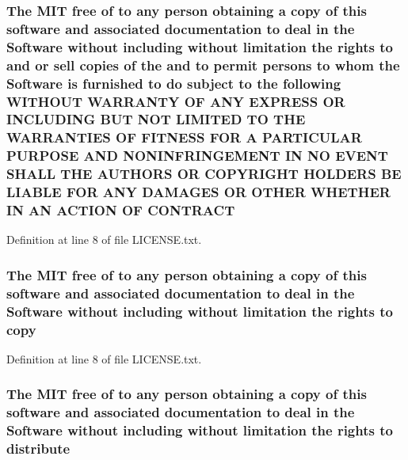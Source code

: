 \hypertarget{LICENSE_8txt_a808df707d490e1041f54a1d24fbbfaa0}{
\subsubsection[{C\-O\-N\-T\-R\-A\-C\-T}]{\setlength{\rightskip}{0pt plus 5cm}The M\-I\-T free of to any person obtaining a {\bf copy} of this software and associated documentation to deal in the {\bf Software} without including without limitation the rights to and or sell copies of the and to permit persons to whom the {\bf Software} is furnished to do subject to the following W\-I\-T\-H\-O\-U\-T W\-A\-R\-R\-A\-N\-T\-Y O\-F A\-N\-Y E\-X\-P\-R\-E\-S\-S O\-R I\-N\-C\-L\-U\-D\-I\-N\-G B\-U\-T N\-O\-T L\-I\-M\-I\-T\-E\-D T\-O T\-H\-E W\-A\-R\-R\-A\-N\-T\-I\-E\-S O\-F F\-I\-T\-N\-E\-S\-S F\-O\-R A P\-A\-R\-T\-I\-C\-U\-L\-A\-R P\-U\-R\-P\-O\-S\-E A\-N\-D N\-O\-N\-I\-N\-F\-R\-I\-N\-G\-E\-M\-E\-N\-T I\-N N\-O E\-V\-E\-N\-T S\-H\-A\-L\-L T\-H\-E A\-U\-T\-H\-O\-R\-S O\-R C\-O\-P\-Y\-R\-I\-G\-H\-T H\-O\-L\-D\-E\-R\-S B\-E L\-I\-A\-B\-L\-E F\-O\-R A\-N\-Y D\-A\-M\-A\-G\-E\-S O\-R O\-T\-H\-E\-R W\-H\-E\-T\-H\-E\-R I\-N A\-N A\-C\-T\-I\-O\-N O\-F C\-O\-N\-T\-R\-A\-C\-T}}\label{LICENSE_8txt_a808df707d490e1041f54a1d24fbbfaa0}


Definition at line 8 of file L\-I\-C\-E\-N\-S\-E.\-txt.

\hypertarget{LICENSE_8txt_aff1d4c6b756ebf691fa44a0904f68658}{
\subsubsection[{copy}]{\setlength{\rightskip}{0pt plus 5cm}The M\-I\-T free of to any person obtaining a copy of this software and associated documentation to deal in the {\bf Software} without including without limitation the rights to copy}}\label{LICENSE_8txt_aff1d4c6b756ebf691fa44a0904f68658}


Definition at line 8 of file L\-I\-C\-E\-N\-S\-E.\-txt.

\hypertarget{LICENSE_8txt_ad8444ae07f9fa7b3e3e0cf4dc4551114}{
\subsubsection[{distribute}]{\setlength{\rightskip}{0pt plus 5cm}The M\-I\-T free of to any person obtaining a {\bf copy} of this software and associated documentation to deal in the {\bf Software} without including without limitation the rights to distribute}}\label{LICENSE_8txt_ad8444ae07f9fa7b3e3e0cf4dc4551114}


